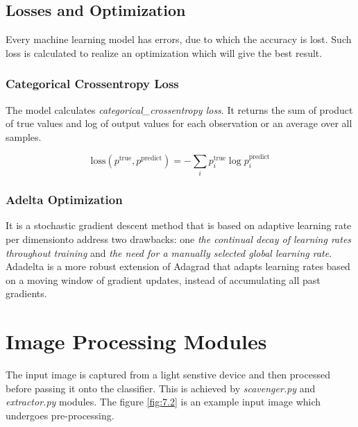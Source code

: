 \documentclass[12pt, a4paper]{report}
\begin{document}
\subsection{Losses and Optimization}
\label{subsec:losoptz}

\hspace{0.5cm} Every machine learning model has errors, due to which the accuracy is lost. Such loss is calculated to realize an optimization which will give the best result.

\subsubsection{Categorical Crossentropy Loss}
\label{subsubsec:catcrplos}
\hspace{0.5cm} The model calculates \textit{categorical\_crossentropy loss}. It returns the sum of product of true values and log of output values for each observation or an average over all samples.

$$\textstyle\text{loss}(p^\text{true}, p^\text{predict}) = -\sum_i p_i^\text{true} \log p_i^\text{predict}$$

\subsubsection{Adelta Optimization}
\label{subsubsec:adltoptz}
\hspace{0.5cm} It is a stochastic gradient descent method that is based on adaptive learning rate per dimensionto address two drawbacks: one \textit{the continual decay of learning rates throughout training} and \textit{the need for a manually selected global learning rate}. Adadelta is a more robust extension of Adagrad that adapts learning rates based on a moving window of gradient updates, instead of accumulating all past gradients.

\newpage
\thispagestyle{fancy}
\section{Image Processing Modules}
\label{sec:cptpromd}
The input image is captured from a light senstive device and then processed before passing it onto the classifier. This is achieved by \textit{scavenger.py} and \textit{extractor.py} modules. The figure \eqref{fig:7.2} is an example input image which undergoes pre-processing.
\end{document}
